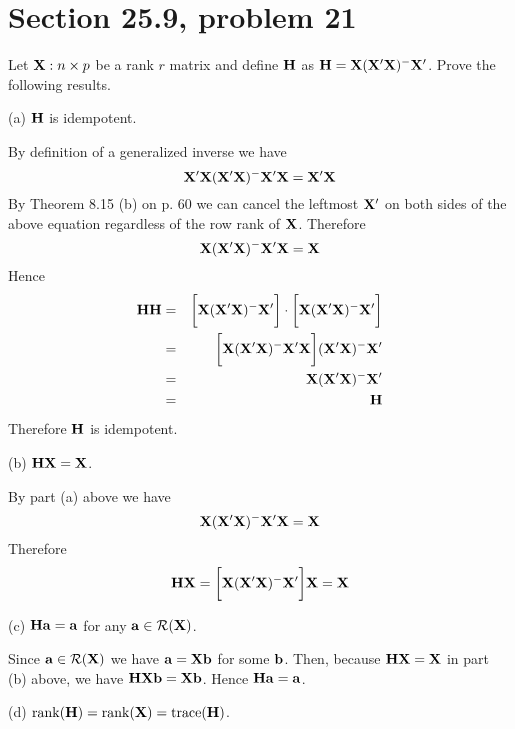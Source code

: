 \section{Section 25.9, problem 21}
Let ${\bf X}:n\times p$ be a rank $r$ matrix and define $\bf H$ as
${\bf H}={\bf X}({\bf X}'{\bf X})^{-{}}{\bf X}'$.
Prove the following results.

\bigskip
\noindent
(a) $\bf H$ is idempotent.

\bigskip
\noindent
By definition of a generalized inverse we have
$${\bf X}'{\bf X}({\bf X}'{\bf X})^{-{}}{\bf X}'{\bf X}
={\bf X}'{\bf X}$$
By Theorem 8.15 (b) on p. 60 we can cancel the leftmost ${\bf X}'$
on both sides of the above equation
regardless of the row rank of $\bf X$.
Therefore
$${\bf X}({\bf X}'{\bf X})^{-{}}{\bf X}'{\bf X}={\bf X}$$
Hence
\begin{eqnarray*}
{\bf HH}&=&
\bigg[{\bf X}({\bf X}'{\bf X})^{-{}}{\bf X}'\bigg]\cdot
\bigg[{\bf X}({\bf X}'{\bf X})^{-{}}{\bf X}'\bigg]\\
&=&\bigg[{\bf X}({\bf X}'{\bf X})^{-{}}
{\bf X}'{\bf X}\bigg]({\bf X}'{\bf X})^{-{}}{\bf X}'\\
&=&{\bf X}({\bf X}'{\bf X})^{-{}}{\bf X}'\\
&=&{\bf H}
\end{eqnarray*}
Therefore $\bf H$ is idempotent.

\bigskip
\noindent
(b) ${\bf HX}={\bf X}$.

\bigskip
\noindent
By part (a) above we have
$${\bf X}({\bf X}'{\bf X})^{-{}}{\bf X}'{\bf X}={\bf X}$$
Therefore
$${\bf HX}=\bigg[{\bf X}({\bf X}'{\bf X})^{-{}}{\bf X}'\bigg]
{\bf X}={\bf X}$$

\bigskip
\noindent
(c) ${\bf Ha}={\bf a}$ for any ${\bf a}\in{\cal R}({\bf X})$.

\bigskip
\noindent
Since ${\bf a}\in{\cal R}({\bf X})$ we have
${\bf a}={\bf Xb}$ for some $\bf b$.
Then, because ${\bf HX}={\bf X}$ in part (b) above,
we have ${\bf HXb}={\bf Xb}$.
Hence ${\bf Ha}={\bf a}$.

\bigskip
\noindent
(d) $\mathop{\rm rank}({\bf H})=\mathop{\rm rank}({\bf X})
=\mathop{\rm trace}({\bf H})$.

